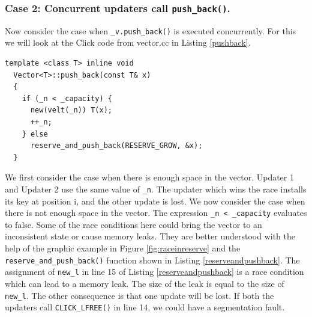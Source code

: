 \documentclass[a4paper]{article}
\begin{document}
\subsubsection{Case 2: Concurrent updaters call \texttt{push\_back()}. }
Now consider the case when \texttt{\_v.push\_back()} is executed concurrently. For this we will look at the Click code from vector.cc in Listing \ref{pushback}.
\begin{lstlisting}[caption = The push\_back() function, label=pushback]
  template <class T> inline void
  Vector<T>::push_back(const T& x)
  {
    if (_n < _capacity) {
      new(velt(_n)) T(x);
      ++_n;
    } else
      reserve_and_push_back(RESERVE_GROW, &x);
  }
\end{lstlisting}
We first consider the case when there is enough space in the vector. Updater 1 and Updater 2 use the same value of \verb+_n+. The updater which wins the race installs its key at position i, and the other update is lost.
We now consider the case when there is not enough space in the vector. The expression \verb$_n < _capacity$ evaluates to false. Some of the race conditions here could bring the vector to an inconsistent state or cause memory leaks. They are better understood with the help of the graphic example in Figure \ref{fig:raceinreserve} and the \texttt{reserve\_and\_push\_back()} function shown in Listing \ref{reserveandpushback}. The assignment of \verb+new_l+ in line 15 of Listing \ref{reserveandpushback} is a race condition which can lead to a memory leak. The size of the leak is equal to the size of \verb+new_l+. The other consequence is that one update will be lost. If both the updaters call \texttt{CLICK\_LFREE()} in line 14, we could have a segmentation fault.
\end{document}
